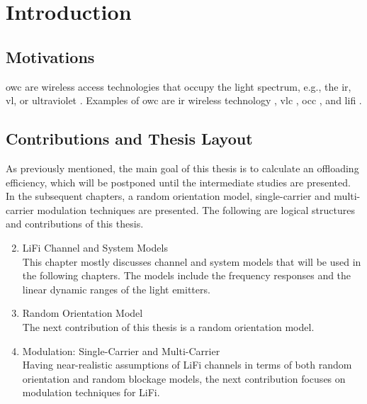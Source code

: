 \chapter{Introduction}
\label{ch:ch_intro}


\section{Motivations}

    \Gls{owc} are wireless access technologies that occupy the light spectrum, e.g., the \gls{ir}, \gls{vl}, or ultraviolet .
    Examples of \gls{owc} are \gls{ir} wireless technology , \gls{vlc} , \gls{occ} , and \gls{lifi} .  
    

\section{Contributions and Thesis Layout}

    As previously mentioned, the main goal of this thesis is to calculate an offloading efficiency, which will be postponed until the intermediate studies are presented.
    In the subsequent chapters, a random orientation model, single-carrier and multi-carrier modulation techniques are presented.
    The following are logical structures and contributions of this thesis.
        \begin{enumerate}[label={Chapter \arabic*:},leftmargin=*]
            \setcounter{enumi}{1}
            \item LiFi Channel and System Models\\
                This chapter mostly discusses channel and system models that will be used in the following chapters.
                The models include the frequency responses and the linear dynamic ranges of the light emitters.
            \item Random Orientation Model\\
                The next contribution of this thesis is a random orientation model.
            \item Modulation: Single-Carrier and Multi-Carrier\\
                Having near-realistic assumptions of LiFi channels in terms of both random orientation and random blockage models, the next contribution focuses on modulation techniques for LiFi.
        \end{enumerate}
    

